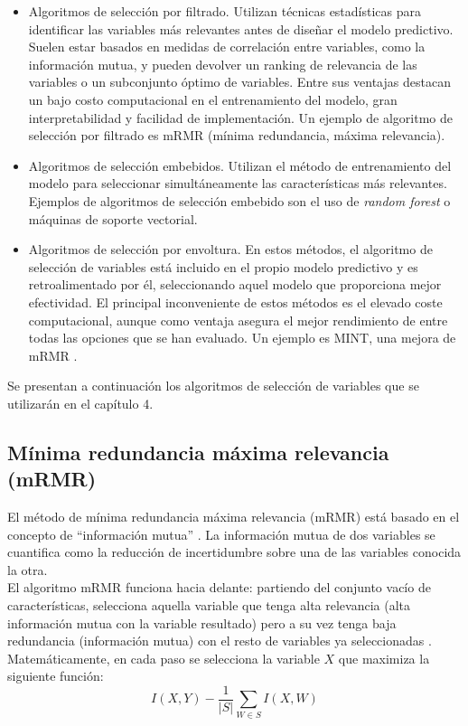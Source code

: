 \begin{itemize}
	\item Algoritmos de selección por filtrado. Utilizan técnicas estadísticas para identificar las variables más relevantes antes de diseñar el modelo predictivo. Suelen estar basados en medidas de correlación entre variables, como la información mutua, y pueden devolver un ranking de relevancia de las variables o un subconjunto óptimo de variables. Entre sus ventajas destacan un bajo costo computacional en el entrenamiento del modelo, gran interpretabilidad y facilidad de implementación. Un ejemplo de algoritmo de selección por filtrado es mRMR (mínima redundancia, máxima relevancia). 
	
	\item Algoritmos de selección embebidos. Utilizan el método de entrenamiento del modelo para seleccionar simultáneamente las características más relevantes. Ejemplos de algoritmos de selección embebido son el uso de \textit{random forest} o máquinas de soporte vectorial. 
	
	\item Algoritmos de selección por envoltura. En estos métodos, el algoritmo de selección de variables está incluido en el propio modelo predictivo y es retroalimentado por él, seleccionando aquel modelo que proporciona mejor efectividad. El principal inconveniente de estos métodos es el elevado coste computacional, aunque como ventaja asegura el mejor rendimiento de entre todas las opciones que se han evaluado. Un ejemplo es MINT, una mejora de mRMR \cite{He2016}.
\end{itemize}

Se presentan a continuación los algoritmos de selección de variables que se utilizarán en el capítulo 4.

\subsection{Mínima redundancia máxima relevancia (mRMR)}

El método de mínima redundancia máxima relevancia (mRMR) está basado en el concepto de ``información mutua'' \cite{Koller1996}. La información mutua de dos variables se cuantifica como la reducción de incertidumbre sobre una de las variables conocida la otra.\\

El algoritmo mRMR funciona hacia delante: partiendo del conjunto vacío de características, selecciona aquella variable que tenga alta relevancia (alta información mutua con la variable resultado) pero a su vez tenga baja redundancia (información mutua) con el resto de variables ya seleccionadas \cite{HanchuanPeng2005}. Matemáticamente, en cada paso se selecciona la variable $X$ que maximiza la siguiente función: $$I(X,Y) - \dfrac{1}{\rvert S \rvert} \sum_{W\in S} I(X, W)$$

